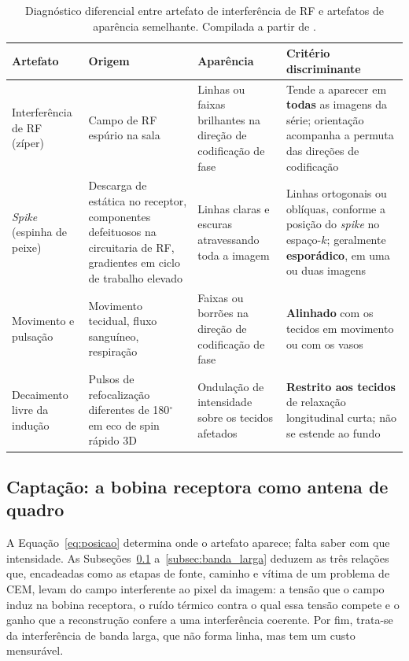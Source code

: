 \documentclass[portuguese]{sbcreviews-2025}%
\begin{document}
\begin{table}[t]
\centering\small
\caption{Diagnóstico diferencial entre artefato de interferência de RF e artefatos de aparência semelhante. Compilada a partir de \citet{kwok2024rf, mugler2014optimized}.}
\label{tab:diferencial}
\begin{tabular}{|p{2.9cm}|p{3.4cm}|p{3.2cm}|p{4.1cm}|}
\hline
\textbf{Artefato} & \textbf{Origem} & \textbf{Aparência} & \textbf{Critério discriminante} \\ \hline
Interferência de RF (zíper) & Campo de RF espúrio na sala & Linhas ou faixas brilhantes na direção de codificação de fase & Tende a aparecer em \textbf{todas} as imagens da série; orientação acompanha a permuta das direções de codificação \\ \hline
\textit{Spike} (espinha de peixe) & Descarga de estática no receptor, componentes defeituosos na circuitaria de RF, gradientes em ciclo de trabalho elevado & Linhas claras e escuras atravessando toda a imagem & Linhas ortogonais ou oblíquas, conforme a posição do \textit{spike} no espaço-$k$; geralmente \textbf{esporádico}, em uma ou duas imagens \\ \hline
Movimento e pulsação & Movimento tecidual, fluxo sanguíneo, respiração & Faixas ou borrões na direção de codificação de fase & \textbf{Alinhado} com os tecidos em movimento ou com os vasos \\ \hline
Decaimento livre da indução & Pulsos de refocalização diferentes de 180$^\circ$ em eco de spin rápido 3D & Ondulação de intensidade sobre os tecidos afetados & \textbf{Restrito aos tecidos} de relaxação longitudinal curta; não se estende ao fundo \\ \hline
\end{tabular}
\end{table}

\subsection{Captação: a bobina receptora como antena de quadro}
\label{subsec:captacao}

A Equação~\eqref{eq:posicao} determina onde o artefato aparece; falta saber com que intensidade. As Subseções~\ref{subsec:captacao} a~\ref{subsec:banda_larga} deduzem as três relações que, encadeadas como as etapas de fonte, caminho e vítima de um problema de CEM, levam do campo interferente ao pixel da imagem: a tensão que o campo induz na bobina receptora, o ruído térmico contra o qual essa tensão compete e o ganho que a reconstrução confere a uma interferência coerente. Por fim, trata-se da interferência de banda larga, que não forma linha, mas tem um custo mensurável.
\end{document}

